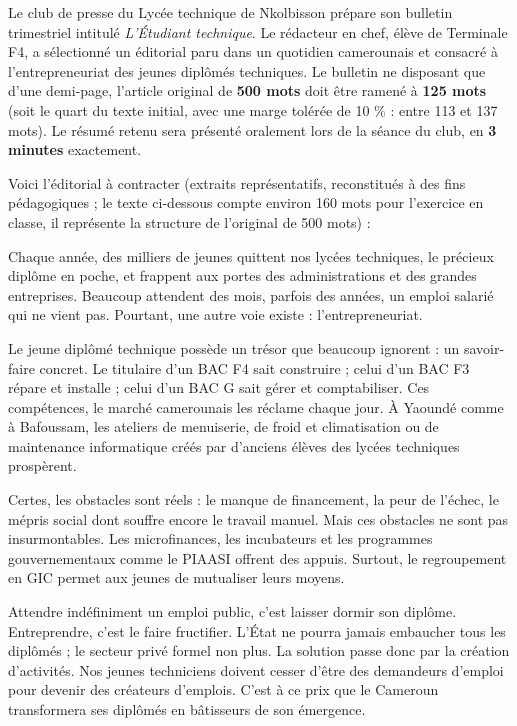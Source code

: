 \documentclass[11pt]{article}
\newcounter{popsec}
\newcounter{popsub}
\newcommand{\courssub}[1]{%
  \stepcounter{popsub}%
  \par\vspace{9pt}\noindent{\popxbold\fontsize{11.5}{13}\selectfont\color{popink}{\color{poporange}\thepopsec.\thepopsub}\hspace{6pt}#1}\par\nopagebreak\vspace{4pt}
}
\begin{document}
\courssub{Situation}

Le club de presse du Lycée technique de Nkolbisson prépare son bulletin trimestriel intitulé \emph{L'Étudiant technique}. Le rédacteur en chef, élève de Terminale F4, a sélectionné un éditorial paru dans un quotidien camerounais et consacré à l'entrepreneuriat des jeunes diplômés techniques. Le bulletin ne disposant que d'une demi-page, l'article original de \textbf{500 mots} doit être ramené à \textbf{125 mots} (soit le quart du texte initial, avec une marge tolérée de 10 \% : entre 113 et 137 mots). Le résumé retenu sera présenté oralement lors de la séance du club, en \textbf{3 minutes} exactement.

Voici l'éditorial à contracter (extraits représentatifs, reconstitués à des fins pédagogiques ; le texte ci-dessous compte environ 160 mots pour l'exercice en classe, il représente la structure de l'original de 500 mots) :

\begin{exemplebox}
\begin{itshape}Chaque année, des milliers de jeunes quittent nos lycées techniques, le précieux diplôme en poche, et frappent aux portes des administrations et des grandes entreprises. Beaucoup attendent des mois, parfois des années, un emploi salarié qui ne vient pas. Pourtant, une autre voie existe : l'entrepreneuriat.

Le jeune diplômé technique possède un trésor que beaucoup ignorent : un savoir-faire concret. Le titulaire d'un BAC F4 sait construire ; celui d'un BAC F3 répare et installe ; celui d'un BAC G sait gérer et comptabiliser. Ces compétences, le marché camerounais les réclame chaque jour. À Yaoundé comme à Bafoussam, les ateliers de menuiserie, de froid et climatisation ou de maintenance informatique créés par d'anciens élèves des lycées techniques prospèrent.

Certes, les obstacles sont réels : le manque de financement, la peur de l'échec, le mépris social dont souffre encore le travail manuel. Mais ces obstacles ne sont pas insurmontables. Les microfinances, les incubateurs et les programmes gouvernementaux comme le PIAASI offrent des appuis. Surtout, le regroupement en GIC permet aux jeunes de mutualiser leurs moyens.

Attendre indéfiniment un emploi public, c'est laisser dormir son diplôme. Entreprendre, c'est le faire fructifier. L'État ne pourra jamais embaucher tous les diplômés ; le secteur privé formel non plus. La solution passe donc par la création d'activités. Nos jeunes techniciens doivent cesser d'être des demandeurs d'emploi pour devenir des créateurs d'emplois. C'est à ce prix que le Cameroun transformera ses diplômés en bâtisseurs de son émergence.\end{itshape}
\end{exemplebox}
\end{document}
